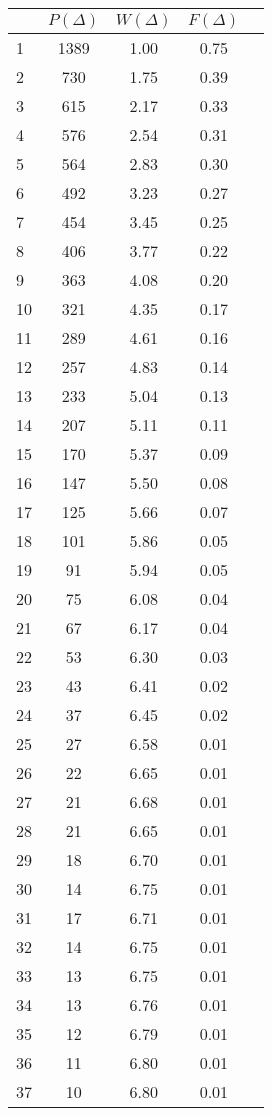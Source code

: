 \documentclass{article}
\begin{document}
\begin{center}
\begin{longtable}{l | c c c c }
& $P(\Delta)$ & $W(\Delta)$ & $F(\Delta)$ \\ \hline
1 & 1389 & 1.00 & 0.75 \\
2 & 730 & 1.75 & 0.39 \\
3 & 615 & 2.17 & 0.33 \\
4 & 576 & 2.54 & 0.31 \\
5 & 564 & 2.83 & 0.30 \\
6 & 492 & 3.23 & 0.27 \\
7 & 454 & 3.45 & 0.25 \\
8 & 406 & 3.77 & 0.22 \\
9 & 363 & 4.08 & 0.20 \\
10 & 321 & 4.35 & 0.17 \\
11 & 289 & 4.61 & 0.16 \\
12 & 257 & 4.83 & 0.14 \\
13 & 233 & 5.04 & 0.13 \\
14 & 207 & 5.11 & 0.11 \\
15 & 170 & 5.37 & 0.09 \\
16 & 147 & 5.50 & 0.08 \\
17 & 125 & 5.66 & 0.07 \\
18 & 101 & 5.86 & 0.05 \\
19 & 91 & 5.94 & 0.05 \\
20 & 75 & 6.08 & 0.04 \\
21 & 67 & 6.17 & 0.04 \\
22 & 53 & 6.30 & 0.03 \\
23 & 43 & 6.41 & 0.02 \\
24 & 37 & 6.45 & 0.02 \\
25 & 27 & 6.58 & 0.01 \\
26 & 22 & 6.65 & 0.01 \\
27 & 21 & 6.68 & 0.01 \\
28 & 21 & 6.65 & 0.01 \\
29 & 18 & 6.70 & 0.01 \\
30 & 14 & 6.75 & 0.01 \\
31 & 17 & 6.71 & 0.01 \\
32 & 14 & 6.75 & 0.01 \\
33 & 13 & 6.75 & 0.01 \\
34 & 13 & 6.76 & 0.01 \\
35 & 12 & 6.79 & 0.01 \\
36 & 11 & 6.80 & 0.01 \\
37 & 10 & 6.80 & 0.01 \\

\end{longtable}
\end{center}
\end{document}
